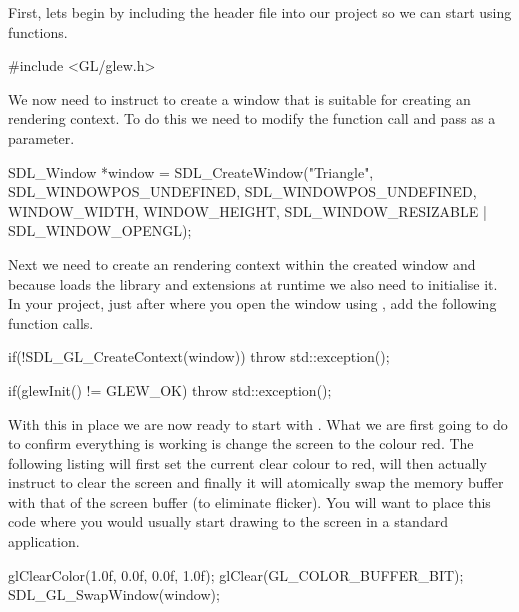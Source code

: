 \documentclass[10pt]{article}
\begin{document}
First, lets begin by including the  header file into our
project so we can start using  functions.

\begin{Code}
  #include <GL/glew.h>
\end{Code}

We now need to instruct  to create a window that is
suitable for creating an  rendering context. To do this
we need to modify the  function call and pass
 as a parameter.

\begin{Code}
  SDL_Window *window = SDL_CreateWindow("Triangle",
    SDL_WINDOWPOS_UNDEFINED, SDL_WINDOWPOS_UNDEFINED,
    WINDOW_WIDTH, WINDOW_HEIGHT,
    SDL_WINDOW_RESIZABLE | SDL_WINDOW_OPENGL);
\end{Code}

Next we need to create an  rendering context within
the created  window and because  loads the
 library and extensions at runtime we also need to initialise
it. In your project, just after where you open the  window
using , add the following function calls.

\begin{Code}
  if(!SDL_GL_CreateContext(window))
  {
    throw std::exception();
  }

  if(glewInit() != GLEW_OK)
  {
    throw std::exception();
  }
\end{Code}


With this in place we are now ready to start with . What
we are first going to do to confirm everything is working is change
the screen to the colour red. The following listing will first set the
current  clear colour to red, will then actually instruct
 to clear the screen and finally it will atomically swap the
 memory buffer with that of the screen buffer (to eliminate
flicker). You will want to place this code where you would usually start
drawing to the screen in a standard  application.

\begin{Code}
  glClearColor(1.0f, 0.0f, 0.0f, 1.0f);
  glClear(GL_COLOR_BUFFER_BIT);
  SDL_GL_SwapWindow(window);
\end{Code}
\end{document}

